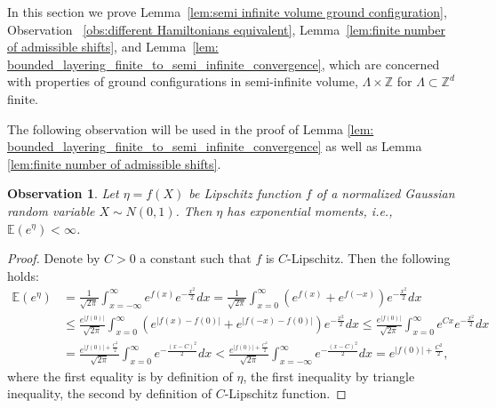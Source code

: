 \documentclass[11pt, reqno]{amsart}
\newtheorem{obs}[theorem]{Observation}
\newcommand{\Z}{\mathbb{Z}}
\newcommand{\E}{\mathbb{E}}
\numberwithin{equation}{section}
\begin{document}
In this section we prove Lemma~\ref{lem:semi infinite volume ground configuration}, Observation ~\ref{obs:different Hamiltonians equivalent}, Lemma~\ref{lem:finite number of admissible shifts}, and Lemma~\ref{lem: bounded_layering_finite_to_semi_infinite_convergence}, which are concerned with properties of ground configurations in semi-infinite volume, $\Lambda\times\Z$ for $\Lambda\subset\Z^d$ finite.

The following observation will be used in the proof of Lemma \ref{lem: bounded_layering_finite_to_semi_infinite_convergence} as well as Lemma \ref{lem:finite number of admissible shifts}. 

\begin{obs}\label{obs: exponential moment exists to lip of gaussian}
Let $\eta=f(X)$ be Lipschitz function $f$ of a normalized Gaussian random variable $X\sim N(0,1)$. Then $\eta$ has exponential moments, i.e., $\E(e^{\eta} ) <\infty$.
\end{obs}

\begin{proof}
Denote by $C>0$ a constant such that $f$ is $C$-Lipschitz. Then the following holds:
\begin{align*}
\E(e^{\eta} )&= \frac{1}{\sqrt{2\pi}}\int_{x=-\infty}^{\infty} e^{f(x)} e^{-\frac{x^2}{2}} dx =
\frac{1}{\sqrt{2\pi}}\int_{x=0}^{\infty} 
\left( e^{f(x)}+e^{f(-x)} \right) e^{-\frac{x^2}{2}} dx \\
&\leq \frac{e^{|f(0)|}}{\sqrt{2\pi}}\int_{x=0}^{\infty} 
\left( e^{|f(x)-f(0)|}+e^{|f(-x)-f(0)|} \right) e^{-\frac{x^2}{2}} dx 
\leq \frac{e^{|f(0)|}}{\sqrt{2\pi}}\int_{x=0}^{\infty} 
e^{Cx} e^{-\frac{x^2}{2}} dx\\
&=\frac{e^{|f(0)|+\frac{C^2}{2}}}{\sqrt{2\pi}}\int_{x=0}^{\infty} 
e^{-\frac{(x-C)^2}{2}} dx<\frac{e^{|f(0)|+\frac{C^2}{2}}}{\sqrt{2\pi}}\int_{x=-\infty}^{\infty} 
e^{-\frac{(x-C)^2}{2}} dx=e^{|f(0)|+\frac{C^2}{2}},
\end{align*}
where the first equality is by definition of $\eta$, the first inequality by triangle inequality, the second by definition of $C$-Lipschitz function. 
\end{proof}
\end{document}
